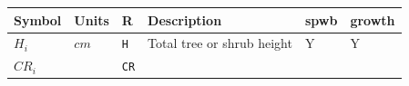 \documentclass[]{book}
\begin{document}
\begin{longtable}[]{@{}llllll@{}}
\toprule
\begin{minipage}[b]{0.10\columnwidth}\raggedright
Symbol\strut
\end{minipage} & \begin{minipage}[b]{0.09\columnwidth}\raggedright
Units\strut
\end{minipage} & \begin{minipage}[b]{0.06\columnwidth}\raggedright
R\strut
\end{minipage} & \begin{minipage}[b]{0.43\columnwidth}\raggedright
Description\strut
\end{minipage} & \begin{minipage}[b]{0.07\columnwidth}\raggedright
spwb\strut
\end{minipage} & \begin{minipage}[b]{0.07\columnwidth}\raggedright
growth\strut
\end{minipage}\tabularnewline
\midrule
\endhead
\begin{minipage}[t]{0.10\columnwidth}\raggedright
\(H_i\)\strut
\end{minipage} & \begin{minipage}[t]{0.09\columnwidth}\raggedright
\(cm\)\strut
\end{minipage} & \begin{minipage}[t]{0.06\columnwidth}\raggedright
\texttt{H}\strut
\end{minipage} & \begin{minipage}[t]{0.43\columnwidth}\raggedright
Total tree or shrub height\strut
\end{minipage} & \begin{minipage}[t]{0.07\columnwidth}\raggedright
Y\strut
\end{minipage} & \begin{minipage}[t]{0.07\columnwidth}\raggedright
Y\strut
\end{minipage}\tabularnewline
\begin{minipage}[t]{0.10\columnwidth}\raggedright
\(CR_i\)\strut
\end{minipage} & \begin{minipage}[t]{0.09\columnwidth}\raggedright
\strut
\end{minipage} & \begin{minipage}[t]{0.06\columnwidth}\raggedright
\texttt{CR}\strut
\end{minipage} & \begin{minipage}[t]{0.43\columnwidth}\raggedright

\end{minipage}
\end{longtable}
\end{document}
